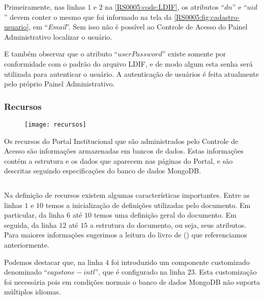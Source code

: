 Primeiramente, nas linhas $1$ e $2$ na \cref{RS0005:code:LDIF}, os atributos ``$dn$'' e ``$uid$''  devem conter o mesmo que foi informado na tela da \cref{RS0005:fig:cadastro-usuario}, em ``\textit{Email}''. Sem isso não é possível ao Controle de Acesso do Painel Administrativo localizar o usuário.

E também observar que o atributo ``$userPassword$'' existe somente por conformidade com o padrão do arquivo \gls{LDIF}, e de modo algum esta senha será utilizada para autenticar o usuário. A autenticação de usuários é feita atualmente pelo próprio Painel Administrativo.

\subsubsection{Recursos}

\begin{figure}[!ht]
    \centering
    \texttt{[image: recursos]}
\end{figure}

Os recursos do Portal Institucional que são administrados pelo Controle de Acesso são informações armazenadas em bancos de dados. Estas informações contém a estrutura e os dados que aparecem nas páginas do Portal, e são descritas seguindo especificações do banco de dados MongoDB\cite{chodorow2013mongodb}.

\begin{code}
    \inputminted[xleftmargin=20pt,fontsize=\footnotesize,breaklines,breakanywhere,linenos=true,label=Category.js]{JavaScript}{../RS0005/anexos/Category.js}
    \caption{Descrição do documento de ``Categories'' do Portal Institucional}\label{RS0005:code:category}
\end{code}

Na definição de recursos existem algumas características importantes. Entre as linhas $1$ e $10$ temos a inicialização de definições utilizadas pelo documento. Em particular, da linha $6$ até $10$ temos uma definição geral do documento. Em seguida, da linha $12$ até $15$ a estrutura do documento, ou seja, seus atributos. Para maiores informações sugerimos a leitura do livro de \citeauthor{chodorow2013mongodb} () que referenciamos anteriormente.

Podemos destacar que, na linha $4$ foi introduzido um componente customizado denominado ``$capstone-intl$'', que é configurado na linha $23$. Esta customização foi necessária pois em condições normais o banco de dados MongoDB não suporta múltiplos idiomas.

